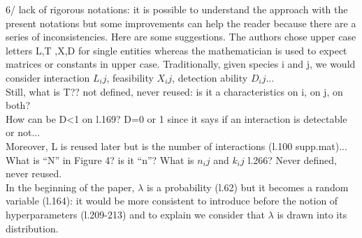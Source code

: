 \documentclass[12pt]{letter}
\newenvironment{refquote}{\bigskip \begin{it}}{\end{it}\smallskip}
\begin{document}
		\begin{refquote}
			6/ lack of rigorous notations: it is possible to understand the approach with the present notations but some improvements can help the reader because there are a series of inconsistencies. Here are some suggestions. The authors chose upper case letters L,T ,X,D for single entities whereas the mathematician is used to expect matrices or constants in upper case. Traditionally, given species i and j, we would consider interaction $L_ij$, feasibility $X_ij$, detection ability $D_ij$... \\
			Still, what is T?? not defined, never reused: is it a characteristics on i, on j, on both? \\
			How can be D<1 on l.169? D=0 or 1 since it says if an interaction is detectable or not... \\
			Moreover, L is reused later but is the number of interactions (l.100 supp.mat)... \\
			What is ``N'' in Figure 4? is it ``n''? What is $n_ij$ and $k_ij$ l.266? Never defined, never reused. \\
			In the beginning of the paper, $\lambda$ is a probability (l.62) but it becomes a random variable (l.164): it would be more consistent to introduce before the notion of hyperparameters  (l.209-213) and to explain we consider that $\lambda$ is drawn into its distribution.
		\end{refquote}
\end{document}
